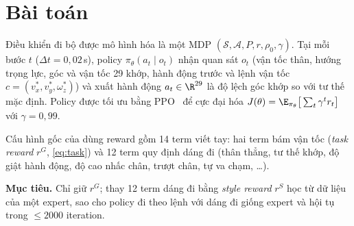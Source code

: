 
\maketitle

\begin{abstract}
\noindent Báo cáo nghiên cứu việc thay thế các reward term quy định dáng đi của policy
đi bộ cho robot hình người Unitree G1 trong  bằng một reward học từ dữ liệu
mẫu theo hướng adversarial inverse reinforcement learning. Một discriminator được huấn
luyện để phân biệt transition của expert với transition của policy; đầu ra của nó được
dùng làm style reward, kết hợp với task reward bám vận tốc. Với reward kết hợp có tỉ
trọng style lớn, replay buffer cho discriminator, discriminator có điều kiện theo lệnh
và reference state initialization (RSI), policy đạt tracking error 0,20\,m/s (expert
0,16\,m/s), độ cao nhấc chân 5,7\,cm (expert 7,5\,cm) và 92\% tổng reward viết tay của
expert sau 2000 iteration, trong khi chưa từng được huấn luyện với các reward term này.
Thí nghiệm ablation cho thấy RSI là thành phần quyết định.
\end{abstract}

\section{Bài toán}
Điều khiển đi bộ được mô hình hóa là một MDP $(\mathcal{S}, \mathcal{A}, P, r, \rho_0,
\gamma)$. Tại mỗi bước $t$ ($\Delta t = 0{,}02$\,s), policy $\pi_\theta(a_t \mid o_t)$ nhận
quan sát $o_t$ (vận tốc thân, hướng trọng lực, góc và vận tốc 29 khớp, hành động trước
và lệnh vận tốc $c = (v_x^*, v_y^*, \omega_z^*)$) và xuất hành động $a_t \in \R^{29}$ là
độ lệch góc khớp so với tư thế mặc định. Policy được tối ưu bằng PPO~\cite{schulman2017ppo}
để cực đại hóa $J(\theta) = \E_{\pi_\theta}\big[\sum_t \gamma^t r_t\big]$ với
$\gamma = 0{,}99$.

Cấu hình gốc của  dùng reward gồm 14 term viết tay: hai term bám vận tốc
(\emph{task reward} $r^G$, \cref{eq:task}) và 12 term quy định dáng đi (thân thẳng, tư thế
khớp, độ giật hành động, độ cao nhấc chân, trượt chân, tự va chạm, \ldots).

\textbf{Mục tiêu.} Chỉ giữ $r^G$; thay 12 term dáng đi bằng \emph{style reward} $r^S$
học từ dữ liệu của một expert, sao cho policy đi theo lệnh với dáng đi giống expert và
hội tụ trong $\le 2000$ iteration.

